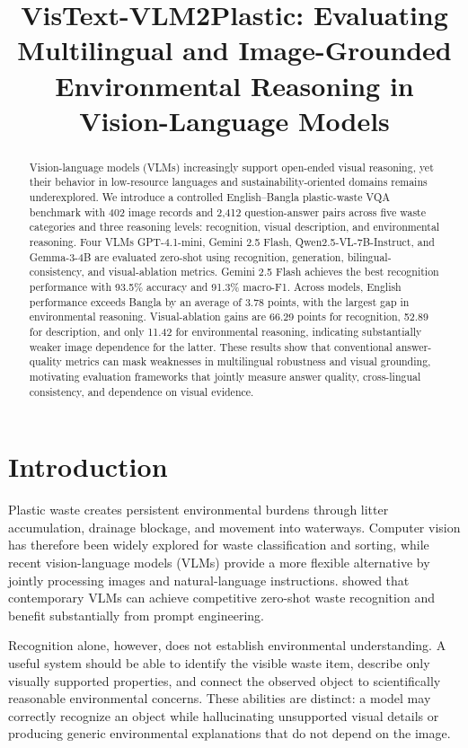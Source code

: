 \documentclass{article}
\title{VisText-VLM2Plastic: Evaluating Multilingual and Image-Grounded Environmental Reasoning in Vision-Language Models}
\begin{document}
\maketitle

\vspace{-0.6cm}

\begin{abstract}
Vision-language models (VLMs) increasingly support open-ended visual reasoning, yet their behavior in low-resource languages and sustainability-oriented domains remains underexplored. We introduce a controlled English--Bangla plastic-waste VQA benchmark with 402 image records and 2,412 question-answer pairs across five waste categories and three reasoning levels: recognition, visual description, and environmental reasoning. Four VLMs GPT-4.1-mini, Gemini 2.5 Flash, Qwen2.5-VL-7B-Instruct, and Gemma-3-4B are evaluated zero-shot using recognition, generation, bilingual-consistency, and visual-ablation metrics. Gemini 2.5 Flash achieves the best recognition performance with 93.5\% accuracy and 91.3\% macro-F1. Across models, English performance exceeds Bangla by an average of 3.78 points, with the largest gap in environmental reasoning. Visual-ablation gains are 66.29 points for recognition, 52.89 for description, and only 11.42 for environmental reasoning, indicating substantially weaker image dependence for the latter. These results show that conventional answer-quality metrics can mask weaknesses in multilingual robustness and visual grounding, motivating evaluation frameworks that jointly measure answer quality, cross-lingual consistency, and dependence on visual evidence.
\end{abstract}

\section{Introduction}
\label{sec:introduction}

Plastic waste creates persistent environmental burdens through litter accumulation, drainage blockage, and movement into waterways. Computer vision has therefore been widely explored for waste classification and sorting, while recent vision-language models (VLMs) provide a more flexible alternative by jointly processing images and natural-language instructions. \citet{malla2025wasterecognition} showed that contemporary VLMs can achieve competitive zero-shot waste recognition and benefit substantially from prompt engineering.

Recognition alone, however, does not establish environmental understanding. A useful system should be able to identify the visible waste item, describe only visually supported properties, and connect the observed object to scientifically reasonable environmental concerns. These abilities are distinct: a model may correctly recognize an object while hallucinating unsupported visual details or producing generic environmental explanations that do not depend on the image.
\end{document}
